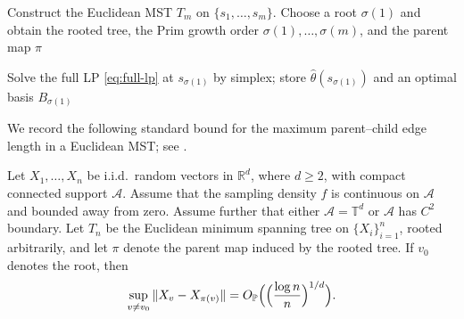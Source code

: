 \documentclass[lineno]{biometrika}
\begin{document}
\begin{algorithm}[t]
\caption{Exact screened warm-start simplex on a multivariate grid via an MST}
\label{alg:mst-screened}
\DontPrintSemicolon
{}

Construct the Euclidean MST $T_m$ on $\{s_1,\ldots,s_m\}$.
Choose a root $\sigma(1)$ and obtain the rooted tree, the Prim growth order $\sigma(1),\ldots,\sigma(m)$, and the
parent map $\pi$ 

Solve the full LP \eqref{eq:full-lp} at $s_{\sigma(1)}$ by simplex; store $\hat\theta(s_{\sigma(1)})$ and an optimal
basis $B_{\sigma(1)}$ 

\end{algorithm}

We record the following standard bound for the maximum parent--child edge length in a Euclidean MST; see
\cite{Penrose1997LongestEdgeMST,Penrose2003RGG}.

\begin{lemma}
Let $X_1,\ldots,X_n$ be i.i.d.\ random vectors in $\mathbb R^d$, where $d\ge 2$, with compact connected support
$\mathcal A$. Assume that the sampling density $f$ is continuous on $\mathcal A$ and bounded away from zero. Assume
further that either $\mathcal A=\mathbb T^d$ or $\mathcal A$ has $C^2$ boundary. Let $T_n$ be the Euclidean minimum
spanning tree on $\{X_i\}_{i=1}^n$, rooted arbitrarily, and let $\pi$ denote the parent map induced by the rooted
tree. If $v_0$ denotes the root, then
\[
\sup_{v\neq v_0}\|X_v-X_{\pi(v)}\| = O_{\mathbb P}\Bigl(\Bigl(\frac{\log n}{n}\Bigr)^{1/d}\Bigr).
\]
\end{lemma}
\end{document}
